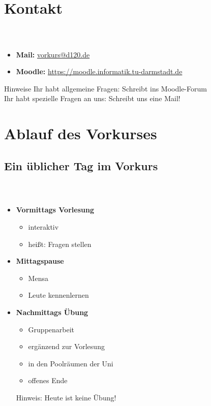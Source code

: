 \section{Kontakt}
\begin{frame}
	\frametitle{\insertsectionhead \\ \insertsubsectionhead}
	\begin{itemize}
		\item \textbf{Mail:} \href{mailto:vorkurs@d120.de}{vorkurs@d120.de}
		\item \textbf{Moodle:}  \href{https://moodle.informatik.tu-darmstadt.de/course/view.php?id=429} {https://moodle.informatik.tu-darmstadt.de}
	\end{itemize}
	\vfill
	\begin{block}{Hinweise}
		Ihr habt allgemeine Fragen: Schreibt ins Moodle-Forum \\
		Ihr habt spezielle Fragen an uns: Schreibt uns eine Mail!
	\end{block}
\end{frame}

\section{Ablauf des Vorkurses}
\subsection{Ein üblicher Tag im Vorkurs}
\begin{frame}
	\frametitle{\insertsectionhead \\ {\small \insertsubsectionhead }}
	\begin{itemize}
		\item \textbf{Vormittags Vorlesung}
		\begin{itemize}
			\item interaktiv
			\item heißt: Fragen stellen
		\end{itemize}
		\item \textbf{Mittagspause}
		\begin{itemize}
			\item Mensa
			\item Leute kennenlernen
		\end{itemize}
		\item \textbf{Nachmittags Übung}
		\begin{itemize}
			\item Gruppenarbeit
			\item ergänzend zur Vorlesung
			\item in den Poolräumen der Uni
			\item offenes Ende
		\end{itemize}
		\begin{block}{Hinweis:}
			Heute ist keine Übung!
		\end{block}
	\end{itemize}
\end{frame}

